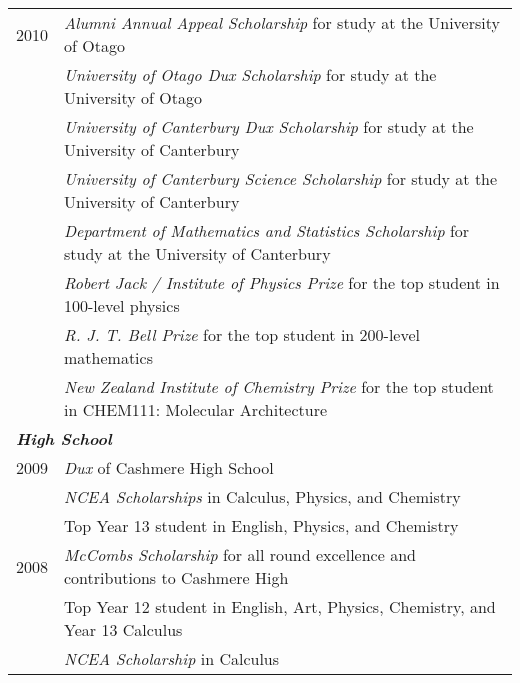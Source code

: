 \documentclass[10pt,a4paper,final]{article}
\begin{document}
\begin{table}[t!]
\begin{tabularx}{\textwidth}{l m{}}
{2010} & \textit{Alumni Annual Appeal Scholarship} for study at the University of Otago\\
       & \textit{University of Otago Dux Scholarship} for study at the University of Otago\\
       & \textit{University of Canterbury Dux Scholarship} for study at the University of Canterbury\\
       & \textit{University of Canterbury Science Scholarship} for study at the University of Canterbury\\
       & \textit{Department of Mathematics and Statistics Scholarship} for study at the University of Canterbury\\
       & \textit{Robert Jack / Institute of Physics Prize} for the top student in 100-level physics\\
       & \textit{R. J. T. Bell Prize} for the top student in 200-level mathematics\\
       & \textit{New Zealand Institute of Chemistry Prize} for the top student in CHEM111: Molecular Architecture \\
\multicolumn{2}{l}{\textbf{\textit{High School}}} \\
{2009} & \textit{Dux} of Cashmere High School\\
& \textit{NCEA Scholarships} in Calculus, Physics, and Chemistry\\
& Top Year 13 student in English, Physics, and Chemistry\\
{2008} & \textit{McCombs Scholarship} for all round excellence and contributions to Cashmere High\\
& Top Year 12 student in English, Art, Physics, Chemistry, and Year 13 Calculus\\
& \textit{NCEA Scholarship} in Calculus
\end{tabularx}
\end{table}
\end{document}
